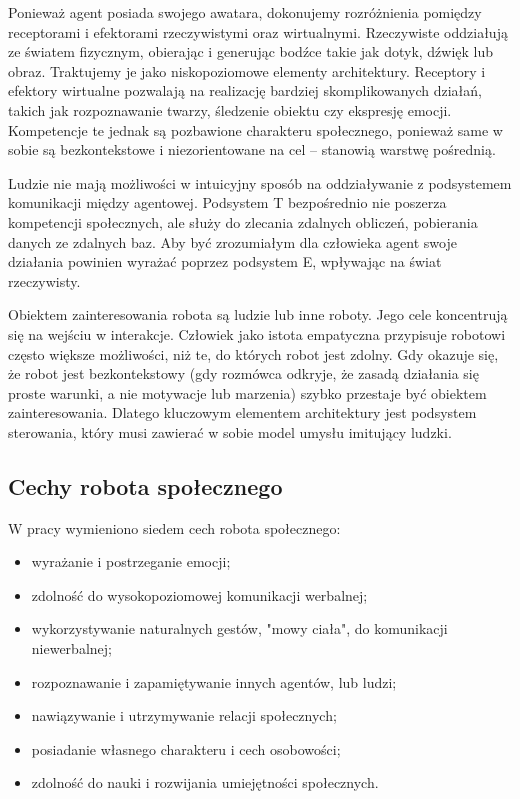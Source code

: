 Ponieważ agent posiada swojego awatara, dokonujemy rozróżnienia pomiędzy receptorami i efektorami rzeczywistymi oraz wirtualnymi. Rzeczywiste oddziałują ze światem fizycznym, obierając i generując bodźce takie jak dotyk, dźwięk lub obraz. Traktujemy je jako niskopoziomowe elementy architektury. Receptory i efektory wirtualne pozwalają na realizację bardziej skomplikowanych działań, takich jak rozpoznawanie twarzy, śledzenie obiektu czy ekspresję emocji. Kompetencje te jednak są pozbawione charakteru społecznego, ponieważ same w sobie są bezkontekstowe i niezorientowane na cel – stanowią warstwę pośrednią.

Ludzie nie mają możliwości w intuicyjny sposób na oddziaływanie z podsystemem komunikacji między agentowej. Podsystem T bezpośrednio nie poszerza kompetencji społecznych, ale służy do zlecania zdalnych obliczeń, pobierania danych ze zdalnych baz. Aby być zrozumiałym dla człowieka agent swoje działania powinien wyrażać poprzez podsystem E, wpływając na świat rzeczywisty. 

Obiektem zainteresowania robota są ludzie lub inne roboty. Jego cele koncentrują się na wejściu w interakcje. Człowiek jako istota empatyczna przypisuje robotowi często większe możliwości, niż te, do których robot jest zdolny. Gdy okazuje się, że robot jest bezkontekstowy (gdy rozmówca odkryje, że zasadą działania się proste warunki, a nie motywacje lub marzenia) szybko przestaje być obiektem zainteresowania. Dlatego kluczowym elementem architektury jest podsystem sterowania, który musi zawierać w sobie model umysłu imitujący ludzki. 

\subsection{Cechy robota społecznego}

W pracy \cite{FONG} %
wymieniono siedem cech robota społecznego:
\begin{itemize}
    \setlength\itemsep{-0.4em}
    \item wyrażanie i postrzeganie emocji;
    \item zdolność do wysokopoziomowej komunikacji werbalnej; 
    \item wykorzystywanie naturalnych gestów, "mowy ciała", do komunikacji niewerbalnej;
    \item rozpoznawanie i zapamiętywanie innych agentów, lub ludzi;
    \item nawiązywanie i utrzymywanie relacji społecznych;
    \item posiadanie własnego charakteru i cech osobowości;
    \item zdolność do nauki i rozwijania umiejętności społecznych.
\end{itemize}

